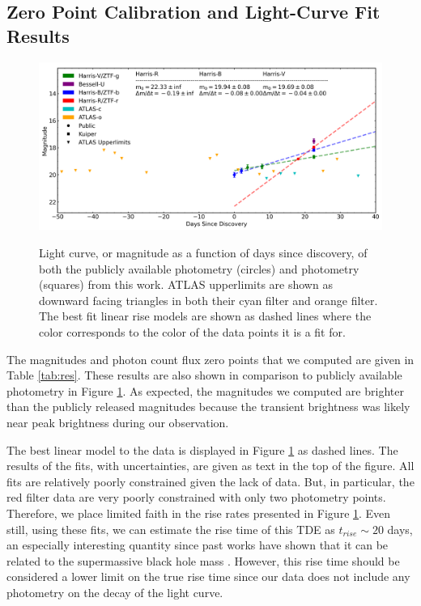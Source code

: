 \documentclass{aastex631}
\begin{document}
\subsection{Zero Point Calibration and Light-Curve Fit Results}
\begin{figure}
  \includegraphics[width=\textwidth]{../analysis/lightcurve.png}
  \label{fig:lc}
  \caption{Light curve, or magnitude as a function of days since discovery, of both the publicly available photometry (circles) and photometry (squares) from this work. ATLAS upperlimits are shown as downward facing triangles in both their cyan filter and orange filter. The best fit linear rise models are shown as dashed lines where the color corresponds to the color of the data points it is a fit for.}
\end{figure}

The magnitudes and photon count flux zero points that we computed are given in Table \ref{tab:res}. These results are also shown in comparison to publicly available photometry in Figure \ref{fig:lc}. As expected, the magnitudes we computed are brighter than the publicly released magnitudes because the transient brightness was likely near peak brightness during our observation.

The best linear model to the data is displayed in Figure \ref{fig:lc} as dashed lines. The results of the fits, with uncertainties, are given as text in the top of the figure. All fits are relatively poorly constrained given the lack of data. But, in particular, the red filter data are very poorly constrained with only two photometry points. Therefore, we place limited faith in the rise rates presented in Figure \ref{fig:lc}. Even still, using these fits, we can estimate the rise time of this TDE as $t_{rise} \sim 20$ days, an especially interesting quantity since past works have shown that it can be related to the supermassive black hole mass \citep{vanVelzen2021}. However, this rise time should be considered a lower limit on the true rise time since our data does not include any photometry on the decay of the light curve.
\end{document}

